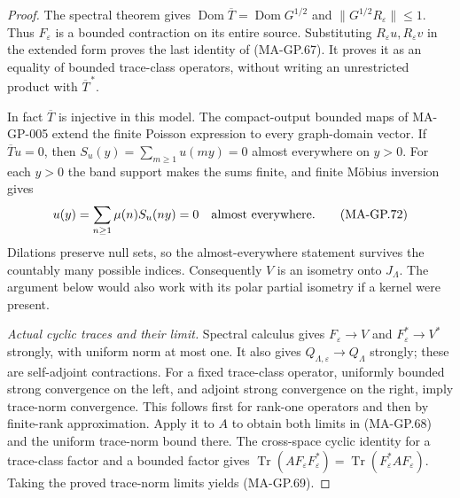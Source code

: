 \begin{proof}
The spectral theorem gives
$\operatorname{Dom}\overline T=\operatorname{Dom}G^{1/2}$
and $\|G^{1/2}R_\varepsilon\|\le1$.
Thus $F_\varepsilon$ is a bounded contraction on its entire
source.  Substituting $R_\varepsilon u,R_\varepsilon v$
in the extended form proves the last identity of (MA-GP.67).
It proves it as an equality of bounded trace-class operators,
without writing an unrestricted product with $\overline T^{\,*}$.

In fact $\overline T$ is injective in this model.
The compact-output bounded maps of MA-GP-005 extend the
finite Poisson expression to every graph-domain vector.
If $\overline T u=0$, then
$S_u(y)=\sum_{m\ge1}u(my)=0$ almost everywhere on $y>0$.
For each $y>0$ the band support makes the sums finite, and
finite M\"obius inversion gives
\[
                     u(y)=\sum_{n\ge1}\mu(n)S_u(ny)=0
                                \quad\hbox{almost everywhere}.
 \tag{MA-GP.72}
\]
Dilations preserve null sets, so the almost-everywhere
statement survives the countably many possible indices.
Consequently $V$ is an isometry onto $J_\Lambda$.
The argument below would also work with its polar partial
isometry if a kernel were present.

\emph{Actual cyclic traces and their limit.}
Spectral calculus gives $F_\varepsilon\to V$ and
$F_\varepsilon^*\to V^*$ strongly, with uniform norm at
most one.  It also gives $Q_{\Lambda,\varepsilon}\to Q_\Lambda$
strongly; these are self-adjoint contractions.
For a fixed trace-class operator, uniformly bounded strong
convergence on the left, and adjoint strong convergence on
the right, imply trace-norm convergence.  This follows first
for rank-one operators and then by finite-rank approximation.
Apply it to $A$ to obtain both limits in (MA-GP.68) and
the uniform trace-norm bound there.
The cross-space cyclic identity for a trace-class factor
and a bounded factor gives
$\operatorname{Tr}(AF_\varepsilon F_\varepsilon^*)
 =\operatorname{Tr}(F_\varepsilon^*AF_\varepsilon)$.
Taking the proved trace-norm limits yields (MA-GP.69).
\end{proof}

